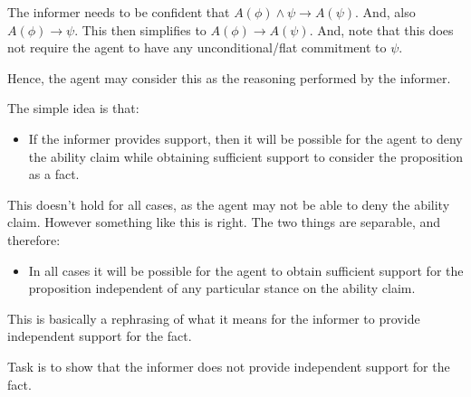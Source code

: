 \documentclass[10pt]{article}
\newcommand{\hozlinedash}[0]{%
  \noindent\hdashrule[0.5ex][c]{\textwidth}{.1pt}{2.5pt}
}
\begin{document}
\begin{note}
  The informer needs to be confident that \(A(\phi) \land \psi \rightarrow A(\psi)\).
  And, also \(A(\phi) \rightarrow \psi\).
  This then simplifies to \(A(\phi) \rightarrow A(\psi)\).
  And, note that this does not require the agent to have any unconditional/flat commitment to \(\psi\).

  Hence, the agent may consider this as the reasoning performed by the informer.
\end{note}

\hozlinedash

\begin{note}
  The simple idea is that:
  \begin{itemize}
  \item If the informer provides support, then it will be possible for the agent to deny the ability claim while obtaining sufficient support to consider the proposition as a fact.
  \end{itemize}
  This doesn't hold for all cases, as the agent may not be able to deny the ability claim.
  However something like this is right.
  The two things are separable, and therefore:
  \begin{itemize}
  \item In all cases it will be possible for the agent to obtain sufficient support for the proposition independent of any particular stance on the ability claim.
  \end{itemize}
  This is basically a rephrasing of what it means for the informer to provide independent support for the fact.

\end{note}

Task is to show that the informer does not provide independent support for the fact.
\end{document}
